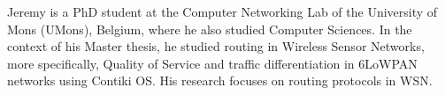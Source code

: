 ​Jeremy is a PhD student at the Computer Networking
Lab of the University of Mons (UMons), Belgium, where he
also studied Computer Sciences. In the context of his Master
thesis, he studied routing in Wireless Sensor Networks, more
specifically, Quality of Service and traffic differentiation
in 6LoWPAN networks using Contiki OS. His research focuses
on routing protocols in WSN.
